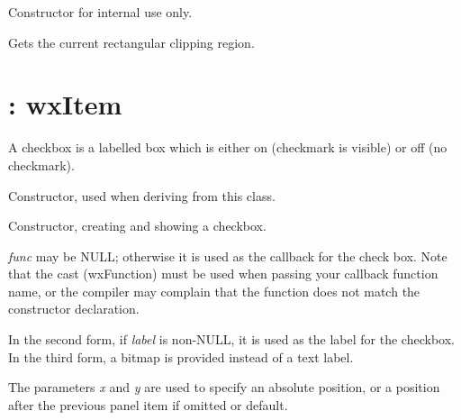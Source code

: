Constructor for internal use only.



Gets the current rectangular clipping region.

\section{: wxItem}\label{wxcheckbox}

A checkbox is a labelled box which is either on (checkmark is visible)
or off (no checkmark).

\label{constrcheckbox}


Constructor, used when deriving from this class.



Constructor, creating and showing a checkbox.

{\it func} may be NULL; otherwise it is used as the callback for the
check box.  Note that the cast (wxFunction) must be used when passing
your callback function name, or the compiler may complain that the
function does not match the constructor declaration.

In the second form, if {\it label} is non-NULL, it is used as the label
for the checkbox. In the third form, a bitmap is provided instead of
a text label.

The parameters {\it x} and {\it y} are used to specify an absolute
position, or a position after the previous panel item if omitted or
default.


